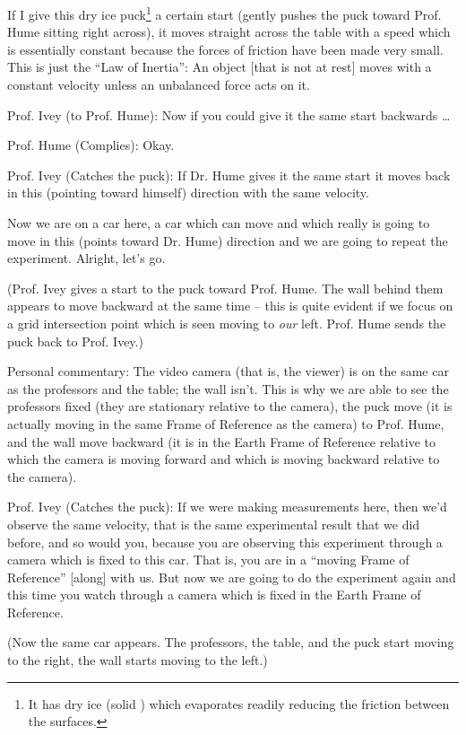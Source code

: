 \documentclass[a6paper]{article}
\begin{document}
If I give this dry ice puck\footnote{It has dry ice (solid ) which evaporates readily reducing the friction between the surfaces.} a certain start (gently pushes the puck toward Prof. Hume sitting right across), it moves straight across the table with a speed which is essentially constant because the forces of friction have been made very small. This is just the ``Law of Inertia'': An object [that is not at rest] moves with a constant velocity unless an unbalanced force acts on it. 

Prof. Ivey (to Prof. Hume): Now if you could give it the same start backwards \dots

Prof. Hume (Complies): Okay.

Prof. Ivey (Catches the puck): If Dr. Hume gives it the same start it moves back in this (pointing toward himself) direction with the same velocity.

Now we are on a car here, a car which can move and which really is going to move in this (points toward Dr. Hume) direction and we are going to repeat the experiment. Alright, let's go.  

(Prof. Ivey gives a start to the puck toward Prof. Hume. The wall behind them appears to move backward at the same time -- this is quite evident if we focus on a grid intersection point which is seen moving to \emph{our} left. Prof. Hume sends the puck back to Prof. Ivey.)

Personal commentary: The video camera (that is, the viewer) is on the same car as the professors and the table; the wall isn't. This is why we are able to see the professors fixed (they are stationary relative to the camera), the puck move (it is actually moving in the same Frame of Reference as the camera) to Prof. Hume, and the wall move backward (it is in the Earth Frame of Reference relative to which the camera is moving forward and which is moving backward relative to the camera). 

Prof. Ivey (Catches the puck): If we were making measurements here, then we'd observe the same velocity, that is the same experimental result that we did before, and so would you, because you are observing this experiment through a camera which is fixed to this car. That is, you are in a ``moving Frame of Reference'' [along] with us. But now we are going to do the experiment again and this time you watch through a camera which is fixed in the Earth Frame of Reference.

(Now the same car appears. The professors, the table, and the puck start moving to the right, the wall starts moving to the left.)
\end{document}
